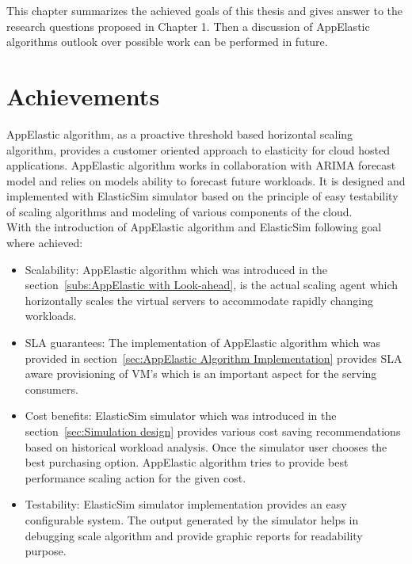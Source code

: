 This chapter summarizes the achieved goals of this thesis and gives answer to the research questions proposed in Chapter 1. Then a discussion of AppElastic algorithms outlook over possible work can be performed in future.

\section{Achievements}
\label{sec:Achievements}
AppElastic algorithm, as a proactive threshold based horizontal scaling algorithm, provides a customer oriented approach to elasticity for cloud hosted applications. AppElastic algorithm works in collaboration with ARIMA forecast model and relies on models ability to forecast future workloads. It is designed and implemented with ElasticSim simulator based on the principle of easy testability of scaling algorithms and modeling of various components of the cloud.
\\
With the introduction of AppElastic algorithm and ElasticSim following goal where achieved:
\begin{itemize}
  \item Scalability: AppElastic algorithm which was introduced in the section~\ref{subs:AppElastic with Look-ahead}, is the actual scaling agent which horizontally scales the virtual servers to accommodate rapidly changing workloads.
  \item SLA guarantees: The implementation of AppElastic algorithm which was provided in section~\ref{sec:AppElastic Algorithm Implementation} provides SLA aware provisioning of VM's which is an important aspect for the serving consumers.
  \item Cost benefits: ElasticSim simulator which was introduced in the section~\ref{sec:Simulation design} provides various cost saving recommendations based on historical workload analysis. Once the simulator user chooses the best purchasing option. AppElastic algorithm tries to provide best performance scaling action for the given cost.
  \item Testability: ElasticSim simulator implementation provides an easy configurable system. The output generated by the simulator helps in debugging scale algorithm and provide graphic reports for readability purpose.
\end{itemize}

